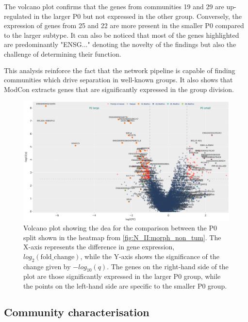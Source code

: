 The volcano plot confirms that the genes from communities 19 and 29 are up-regulated in the larger P0 but not expressed in the other group. Conversely, the expression of genes from 25 and 22 are more present in the smaller P0 compared to the larger subtype. It can also be noticed that most of the genes highlighted are predominantly "ENSG..." denoting the novelty of the findings but also the challenge of determining their function. 

This analysis reinforce the fact that the network pipeline is capable of finding communities which drive separation in well-known groups. It also shows that ModCon extracts genes that are significantly expressed in the group division.


\begin{figure}    
    \centering
    \includegraphics[width=1.0\textwidth,height=1.0\textheight,keepaspectratio]{Sections/Network_II/resources/non_tum/p0_split_dea.png}
    \caption{Volcano plot showing the \acrfull{dea} for the comparison between the P0 split shown in the heatmap from \cref{fig:N_II:morph_non_tum}. The X-axis represents the difference in gene expression, $log_2(\text{fold\_change})$, while the Y-axis shows the significance of the change given by $-log_{10}(q)$. The genes on the right-hand side of the plot are those significantly expressed in the larger P0 group, while the points on the left-hand side are specific to the smaller P0 group.}
    \label{fig:N_II:p0_split}
\end{figure}

\subsection{Community characterisation} \label{s:N_II:comm_charact}

